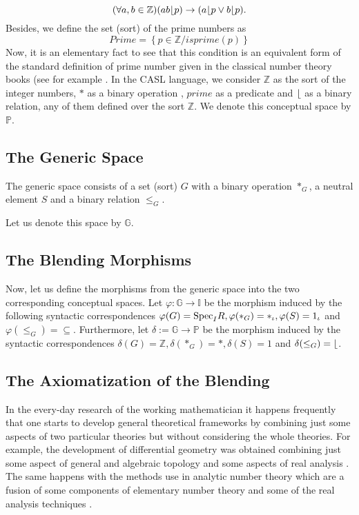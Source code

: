 \[(\forall a,b\in \mathbb{Z})(ab \lfloor p)\rightarrow (a \lfloor p \vee b \lfloor p).\] 
Besides, we define the set (sort) of the prime numbers as 
\[ Prime=\left\{ p\in \mathbb{Z}/ isprime(p)\right\}\] Now, it is an
elementary fact to see that this condition is an equivalent form of
the standard definition of prime number given in the classical number
theory books (see for example \cite{Apostol76}. In the CASL language,
  we consider $\mathbb{Z}$ as the sort of the integer numbers, $*$ as
  a binary operation , $prime$ as a predicate and $\lfloor$ as a
  binary relation, any of them defined over the sort $\mathbb{Z}$.
  \newline\indent We denote this conceptual space by $\mathbb{P}$.

\subsection{The Generic Space}

The generic space consists of a set (sort) $G$ with a binary operation $*_G$, a neutral element $S$ and a binary relation $\leq_G$.

  Let us denote this space by $\mathbb{G}$.

\subsection{The Blending Morphisms}
Now, let us define the morphisms from the generic space into the two corresponding conceptual spaces. Let $\varphi: \mathbb{G}\rightarrow \mathbb{I}$ be the morphism induced by the following syntactic correspondences $\varphi(G)={\rm Spec}_IR,\varphi(*_G)=*_{\iota}, \varphi(S)=1_{\iota}$ and $\varphi(\leq_G)=\subseteq$.
\newline\indent
Furthermore, let $\delta:=\mathbb{G}\rightarrow\mathbb{P}$ be the morphism induced by the syntactic correspondences $\delta(G)=\mathbb{Z}, \delta(*_G)=*, \delta(S)=1$ and $\delta(\leq_G)= \lfloor$.

\subsection{The Axiomatization of the Blending}
In the every-day research of the working mathematician it happens
frequently that one starts to develop general theoretical frameworks
by combining just some aspects of two particular theories but without
considering the whole theories. For example, the development of
differential geometry was obtained combining just some aspect of
general and algebraic topology and some aspects of real analysis
\parencite{VelCad05}. The same happens with the methods use in
analytic number theory which are a fusion of some components of
elementary number theory and some of the real analysis techniques
\parencite{Apostol76}.

